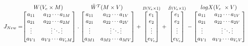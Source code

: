 \[J_{New } =\stackrel{\mbox{$W( V_{e}\times M)$ }}{%
    \begin{bmatrix}
    a_{11} & a_{12}  \cdots  a_{1M} \\
    a_{21} & a_{22}  \cdots  a_{2M} \\
    \vdots & \vdots  \ddots  \vdots \\
    a_{V1} & a_{V2}  \cdots  a_{V
_{e}M}
    \end{bmatrix}%
  } .
  \stackrel{\mbox{$\tilde{W}^T(M \times V)$ }}{%
    \begin{bmatrix}
    a_{11} & a_{12}  \cdots  a_{1V} \\
    a_{21} & a_{22} \cdots  a_{2V} \\
    \vdots & \vdots \ddots \vdots \\
    a_{M1} & a_{M2}  \cdots  a_{MV}
    \end{bmatrix}%
  } +
  \stackrel{B( V_{e}\times 1)}{%
    \begin{bmatrix}
    e_1 \\
    e_2 \\
    \vdots \\
    e_{V_{e}}
    \end{bmatrix}%
   }
   +
  \stackrel{\tilde{B}(V_{e}\times 1)}{%
    \begin{bmatrix}
    e_1 \\
    e_2 \\
    \vdots \\
    e_{V_{e}}
    \end{bmatrix}%
   }-
   \stackrel{\mbox{$logX( V_{e}\ \times V)$ }}{%
    \begin{bmatrix}
    a_{11} & a_{12}  \cdots  a_{1V} \\
    a_{21} & a_{22}  \cdots  a_{2V} \\
    \vdots & \vdots  \ddots  \vdots \\
    a_{V1} & a_{V2}  \cdots  a_{V_{e}V}
    \end{bmatrix}%
  }
\]

